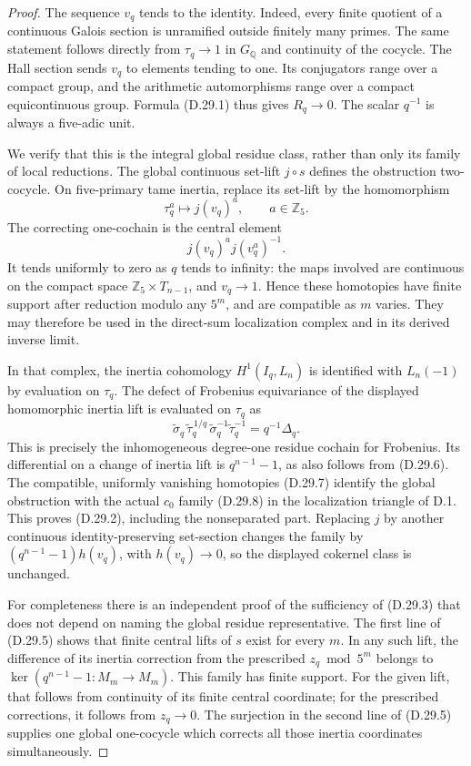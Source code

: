 \begin{proof}
The sequence \(v_q\) tends to the
identity. Indeed, every finite quotient
of a continuous Galois section is
unramified outside finitely many primes.
The same statement follows directly
from \(\tau_q\to1\) in \(G_{\mathbb Q}\)
and continuity of the cocycle. The
Hall section sends \(v_q\) to elements
tending to one. Its conjugators range
over a compact group, and the arithmetic
automorphisms range over a compact
equicontinuous group. Formula (D.29.1)
thus gives \(R_q\to0\). The scalar
\(q^{-1}\) is always a five-adic unit.

We verify that this is the integral
global residue class, rather than only
its family of local reductions. The
global continuous set-lift \(j\circ s\)
defines the obstruction two-cocycle.
On five-primary tame inertia, replace
its set-lift by the homomorphism
\[
          \tau_q^a\longmapsto j(v_q)^a,
                    \qquad a\in\mathbb Z_5.
\]
The correcting one-cochain is the
central element
\[
              j(v_q)^a j(v_q^a)^{-1}.           \tag{D.29.7}
\]
It tends uniformly to zero as \(q\)
tends to infinity: the maps involved
are continuous on the compact space
\(\mathbb Z_5\times T_{n-1}\), and
\(v_q\to1\). Hence these homotopies
have finite support after reduction
modulo any \(5^m\), and are compatible
as \(m\) varies. They may therefore
be used in the direct-sum localization
complex and in its derived inverse limit.

In that complex, the inertia cohomology
\(H^1(I_q,L_n)\) is identified with
\(L_n(-1)\) by evaluation on \(\tau_q\).
The defect of Frobenius equivariance
of the displayed homomorphic inertia
lift is evaluated on \(\tau_q\) as
\[
 \widetilde\sigma_q\,
       \widetilde\tau_q^{\,1/q}\,
       \widetilde\sigma_q^{-1}
       \widetilde\tau_q^{-1}
              =q^{-1}\Delta_q.                 \tag{D.29.8}
\]
This is precisely the inhomogeneous
degree-one residue cochain for Frobenius.
Its differential on a change of inertia
lift is \(q^{n-1}-1\), as also follows
from (D.29.6). The compatible, uniformly
vanishing homotopies (D.29.7) identify
the global obstruction with the actual
\(c_0\) family (D.29.8) in the
localization triangle of D.1. This
proves (D.29.2), including the
nonseparated part. Replacing \(j\) by
another continuous identity-preserving
set-section changes the family by
\((q^{n-1}-1)h(v_q)\), with
\(h(v_q)\to0\), so the displayed
cokernel class is unchanged.

For completeness there is an independent
proof of the sufficiency of (D.29.3)
that does not depend on naming the
global residue representative. The
first line of (D.29.5) shows that
finite central lifts of \(s\) exist
for every \(m\). In any such lift,
the difference of its inertia correction
from the prescribed \(z_q\bmod5^m\)
belongs to
\(\ker(q^{n-1}-1:M_m\to M_m)\).
This family has finite support. For
the given lift, that follows from
continuity of its finite central
coordinate; for the prescribed corrections,
it follows from \(z_q\to0\). The
surjection in the second line of
(D.29.5) supplies one global one-cocycle
which corrects all those inertia
coordinates simultaneously.


\end{proof}
